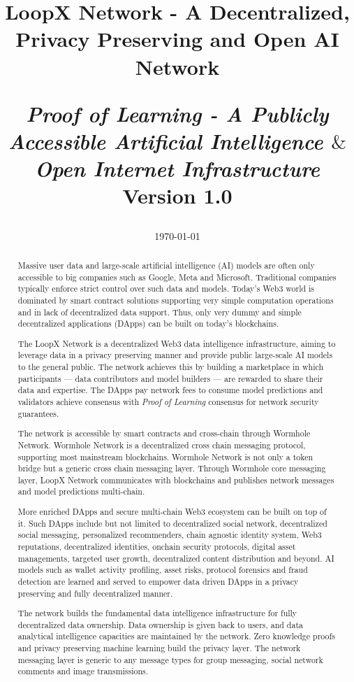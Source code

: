 \documentclass[11pt,letterpaper]{article}
\title{
\begin{medium}
\vspace{15pt}
  \textsf{LoopX Network - A Decentralized, Privacy Preserving and Open AI Network}
\end{medium} 

\begin{small}
\vspace{15pt}
  \textsf{\emph{Proof of Learning - A Publicly Accessible Artificial Intelligence $\&$ Open Internet Infrastructure}}\\
  \textsf{Version 1.0}
\vspace{-20pt}
\end{small} 
\date{\today}
}
\begin{document}
\maketitle
\vspace{5pt}
\begin{abstract}
Massive user data and large-scale artificial intelligence (AI) models are often only accessible to big companies such as Google, Meta and Microsoft. Traditional companies typically enforce strict control over such data and models. Today's Web3 world is dominated by smart contract solutions supporting very simple computation operations and in lack of decentralized data support. Thus, only very dummy and simple decentralized applications (DApps) can be built on today's blockchains.

The LoopX Network is a decentralized Web3 data intelligence infrastructure, aiming to leverage data in a privacy preserving manner and provide public large-scale AI models to the general public. The network achieves this by building a marketplace in which participants --- data contributors and model builders --- are rewarded to share their data and expertise. The DApps pay network fees to consume model predictions and validators achieve consensus with \emph{Proof of Learning} consensus for network security guarantees.

The network is accessible by smart contracts and cross-chain through Wormhole Network. Wormhole Network is a decentralized cross chain messaging protocol, supporting most mainstream blockchains. Wormhole Network is not only a token bridge but a generic cross chain messaging layer. Through Wormhole core messaging layer, LoopX Network communicates with blockchains and publishes network messages and model predictions multi-chain.

More enriched DApps and secure multi-chain Web3 ecosystem can be built on top of it. Such DApps include but not limited to decentralized social network, decentralized social messaging, personalized recommenders, chain agnostic identity system, Web3 reputations, decentralized identities, onchain security protocols, digital asset managements, targeted user growth, decentralized content distribution and beyond. AI models such as wallet activity profiling, asset risks, protocol forensics and fraud detection are learned and served to empower data driven DApps in a privacy preserving and fully decentralized manner.

The network builds the fundamental data intelligence infrastructure for fully decentralized data ownership. Data ownership is given back to users, and data analytical intelligence capacities are maintained by the network. Zero knowledge proofs and privacy preserving machine learning build the privacy layer. The network messaging layer is generic to any message types for group messaging, social network comments and image transmissions.
\end{abstract}
\end{document}
